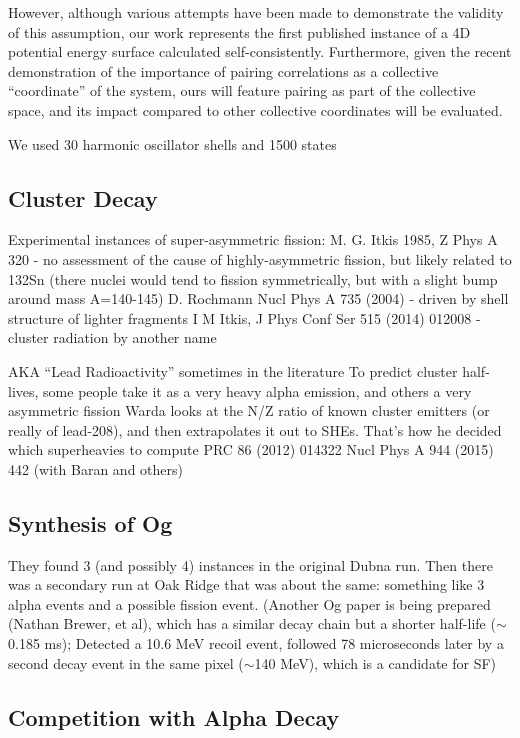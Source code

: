 However, although various attempts have been made to demonstrate the validity of this assumption, our work represents the first published instance of a 4D potential energy surface calculated self-consistently. Furthermore, given the recent demonstration of the importance of pairing correlations as a collective ``coordinate'' of the system, ours will feature pairing as part of the collective space, and its impact compared to other collective coordinates will be evaluated.

We used 30 harmonic oscillator shells and 1500 states

\subsection{Cluster Decay}

Experimental instances of super-asymmetric fission:
M. G. Itkis 1985, Z Phys A 320 - no assessment of the cause of highly-asymmetric fission, but likely related to 132Sn (there nuclei would tend to fission symmetrically, but with a slight bump around mass A=140-145)
D. Rochmann Nucl Phys A 735 (2004) - driven by shell structure of lighter fragments
I M Itkis, J Phys Conf Ser 515 (2014) 012008 - cluster radiation by another name

AKA “Lead Radioactivity” sometimes in the literature
To predict cluster half-lives, some people take it as a very heavy alpha emission, and others a very asymmetric fission
Warda looks at the N/Z ratio of known cluster emitters (or really of lead-208), and then extrapolates it out to SHEs. That’s how he decided which superheavies to compute
PRC 86 (2012) 014322
Nucl Phys A 944 (2015) 442 (with Baran and others)


\subsection{Synthesis of Og}

They found 3 (and possibly 4) instances in the original Dubna run. Then there was a secondary run at Oak Ridge that was about the same: something like 3 alpha events and a possible fission event. (Another Og paper is being prepared (Nathan Brewer, et al), which has a similar decay chain but a shorter half-life ($\sim$0.185 ms); Detected a 10.6 MeV recoil event, followed 78 microseconds later by a second decay event in the same pixel ($\sim$140 MeV), which is a candidate for SF)

\subsection{Competition with Alpha Decay}

